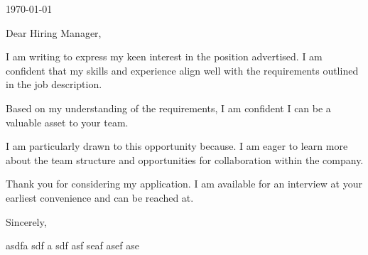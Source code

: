 \documentclass[letterpaper,11pt]{article}
\begin{document}
\today

Dear Hiring Manager,

I am writing to express my keen interest in the position advertised. I am confident that my skills and experience align well with the requirements outlined in the job description.

Based on my understanding of the requirements, I am confident I can be a valuable asset to your team.

I am particularly drawn to this opportunity because. I am eager to learn more about the team structure and opportunities for collaboration within the company.

Thank you for considering my application. I am available for an interview at your earliest convenience and can be reached at.

Sincerely,

asdfa
sdf
a
sdf
asf
seaf
asef
ase

\end{document}
